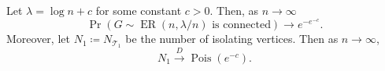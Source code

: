 \begin{theorem}
	Let \(\lambda = \log n + c\) for some constant \(c > 0\). Then, as \(n \to \infty \)
	\[
		\Pr_{}\left(G \sim \operatorname{ER}(n, \lambda / n) \text{ is connected} \right)
		\to e^{-e^{-c}}.
	\]
	Moreover, let \(N_1 \coloneqq N_{\mathcal{T} _1}\) be the number of isolating vertices. Then as \(n \to \infty \),
	\[
		N_1
		\overset{D}{\to} \operatorname{Pois}(e^{-c}) .
	\]
\end{theorem}